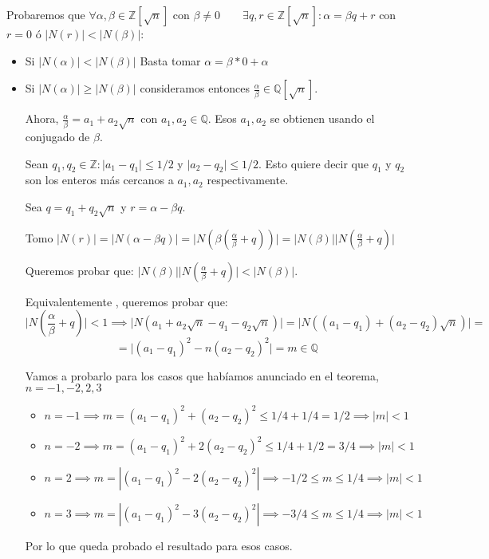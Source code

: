 \documentclass[11pt, a4paper, titlepage]{article}
\makeatletter
\renewenvironment{proof}[1][\proofname] {\vspace{-15pt}\par\pushQED{\qed}\normalfont\topsep6\p@\@plus6\p@\relax\trivlist\item[\hskip\labelsep\it#1\@addpunct{.}]\ignorespaces}{\popQED\endtrivlist\@endpefalse}
\providecommand{\ent}{\mathbb{Z}}
\providecommand{\rac}{\mathbb{Q}}
\providecommand{\abs}[1]{\lvert#1\rvert}
\theoremstyle{theorem-style}
\theoremstyle{definition-style}
\theoremstyle{remark-style}
\theoremstyle{example-style}
\makeatother
\begin{document}
\begin{proof}
	Probaremos que $\forall \alpha, \beta \in \ent[\sqrt{n}]$ con $\beta \neq 0 \quad \quad \exists q,r \in \ent[\sqrt{n}] : \alpha = \beta q + r$ con $r=0$ ó $\abs{N(r)} < \abs{N(\beta)}$:
	
	\begin{itemize}
	\item Si $\abs{N(\alpha)} < \abs{N(\beta)}$ Basta tomar $\alpha  =  \beta * 0 + \alpha$
	
	\item Si $\abs{N(\alpha)} \geq \abs{N(\beta)}$ consideramos entonces  $\frac{\alpha}{\beta} \in \rac[\sqrt{n}]$.
	
	Ahora, $\frac{\alpha}{\beta} = a_1 + a_2\sqrt{n}$ con $a_1, a_2 \in \rac $. Esos $a_1,a_2$ se obtienen usando el conjugado de $\beta$.
	
	Sean $q_1,q_2 \in \ent : \abs{a_1-q_1}\leq 1/2$ y $\abs{a_2-q_2}\leq 1/2$. Esto quiere decir que $q_1$ y $q_2$ son los enteros más cercanos a $a_1,a_2$ respectivamente.
	
	Sea $q=q_1+q_2\sqrt{n}$  y $r = \alpha - \beta q$.
	
	Tomo $\abs{N(r)} = \abs{N(\alpha - \beta q)} = \abs{N(\beta(\frac{\alpha}{\beta}+ q))} = \abs{N(\beta)}\abs{N(\frac{\alpha}{\beta}+ q)}$
	
	Queremos probar que: $\abs{N(\beta)}\abs{N(\frac{\alpha}{\beta}+ q)} < \abs{N(\beta)}$.
	
	Equivalentemente , queremos probar que:
	\[
	  \abs{N(\frac{\alpha}{\beta}+ q)} < 1 \implies \abs{N(a_1+a_2\sqrt{n}-q_1 -q_2\sqrt{n})} = \abs{N((a_1-q_1) + (a_2-q_2)\sqrt{n})} = \]
	  \[
	 = \abs{(a_1-q_1)^2 - n(a_2-q_2)^2} = m \in \rac
	 \]
	 
Vamos a probarlo para los casos que habíamos anunciado en el teorema, $n = -1,-2,2,3$

\begin{itemize}
	\item $n=-1 \implies m= (a_1-q_1)^2 +(a_2-q_2)^2 \leq 1/4 + 1/4 = 1/2 \implies \abs{m} < 1$
	
	\item $n=-2 \implies m = (a_1-q_1)^2 +2(a_2-q_2)^2 \leq 1/4 + 1/2 = 3/4 \implies \abs{m} < 1$
	
	\item $n=2 \implies m = |(a_1-q_1)^2 -2(a_2-q_2)^2 |\implies -1/2 \leq m \leq 1/4 \implies \abs{m} < 1$
	
	\item $n=3 \implies m = |(a_1-q_1)^2 -3(a_2-q_2)^2| \implies -3/4 \leq m \leq 1/4 \implies \abs{m} < 1$
\end{itemize}

Por lo que queda probado el resultado para esos casos.
	
\end{itemize} 
\end{proof}
\end{document}
